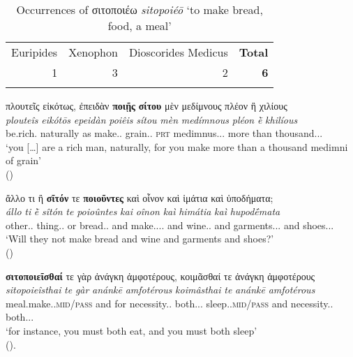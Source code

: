 \documentclass[output=paper,colorlinks,citecolor=brown]{langscibook}
\begin{document}
\begin{table}
	\caption{Occurrences of σιτοποιέω \textit{sitopoiéō} `to make bread, food, a meal'}
	\label{tab:F:occurrences-sitopoieo}
	\begin{tabular}{rrrr}
    \lsptoprule
		Euripides & Xenophon & Dioscorides Medicus & \textbf{Total} \\
		1  & 3  & 2    & \textbf{6} \\
    \lspbottomrule
	\end{tabular}
\end{table}

\ea \label{ex:15}
\glll πλουτεῖς	εἰκότως,	ἐπειδὰν	\textbf{ποιῇς}			\textbf{σίτου}		μὲν μεδίμνους		πλέον		ἢ	χιλίους\\
\textit{plouteîs}	\textit{eikótōs}		\textit{epeidàn}	\textit{poiêis}			\textit{sítou}		\textit{mèn} \textit{medímnous}		\textit{pléon}		\textit{ḕ}	\textit{khilíous}\\
be.rich.\Ssg{}	naturally	as		make.\Sbjv{}.\Ssg{}	grain.\Gen{}.\M{}	\textsc{prt} medimnus.\Acc{}.\M{}.\Pl{}	more		than	thousand.\Acc{}.\M{}.\Pl{}\\
\glt `you [\ldots{}] are a rich man, naturally, for you make more than a thousand medimni of grain' \\
\hspace*{\fill}()
\z

\ea \label{ex:16}
\glll [\ldots{}] ἄλλο            τι         ἢ          \textbf{σῖτόν}            τε         \textbf{ποιοῦντες}               καὶ         οἶνον καὶ       ἱμάτια                      καὶ           ὑποδήματα;\\
{} \textit{állo}              \textit{ti}         \textit{ḕ}          \textit{sîtón}             \textit{te}         \textit{poioûntes}                \textit{kai}         \textit{oînon} \textit{kaì}       \textit{himátia}                    \textit{kaì}           \textit{hupodḗmata}\\
{} other.\Acc{}.\N{}    thing.\Acc{}.\N{}    or       bread.\Acc{}.\M{}     and     make.\Ptcp{}.\Nom{}.\M{}.\Pl{}      and    wine.\Acc{}.\M{}  and      garments.\Acc{}.\N{}.\Pl{}        and             shoes.\Acc{}.\N{}.\Pl{}\\
\glt `Will they not make bread and wine and garments and shoes?' \\
\hspace*{\fill}()
\z

\ea \label{ex:17}
\glll \textbf{σιτοποιεῖσθαί}		τε	γὰρ	 ἀνάγκη		ἀμφοτέρους,	κοιμᾶσθαί τε	ἀνάγκη		ἀμφοτέρους \\
\textit{sitopoieîsthai}		\textit{te}	\textit{gàr}	 \textit{anánkē}		\textit{amfotérous}	\textit{koimâsthai} \textit{te}	\textit{anánkē}			\textit{amfotérous}\\
meal.make.\Inf{}.\textsc{mid/pass}	and	for	 necessity.\Nom.\F{}	both.\Acc{}.\M{}.\Pl{}	sleep.\Inf{}.\textsc{mid/pass} and	necessity.\Nom{}.\F{}	both.\Acc{}.\M{}.\Pl{}\\
\glt `for instance, you must both eat, and you must both sleep' \\
\hspace*{\fill}().
\z
\end{document}
